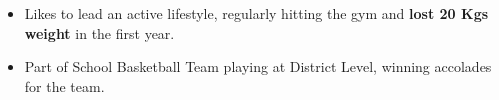 {\fontsize{11pt}{1em}\bodyfontlight\upshape\color{text}
  \begin{itemize}
	  \item Likes to lead an active lifestyle, regularly hitting the gym and \textbf{lost 20 Kgs weight} in the first year. 
  \item Part of School Basketball Team playing at District Level, winning accolades for the team.
  \end{itemize}
}




